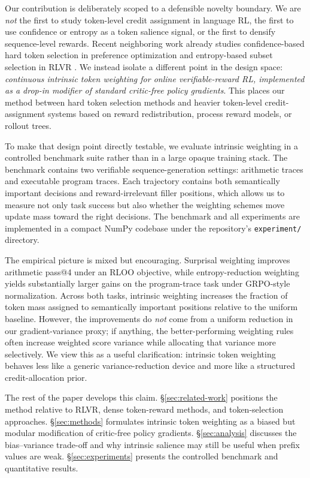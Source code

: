 Our contribution is deliberately scoped to a defensible novelty boundary. We are \emph{not} the first to study token-level credit assignment in language RL, the first to use confidence or entropy as a token salience signal, or the first to densify sequence-level rewards. Recent neighboring work already studies confidence-based hard token selection in preference optimization \citep{yoon2025confpo} and entropy-based subset selection in RLVR \citep{wang2025beyond8020}. We instead isolate a different point in the design space: \emph{continuous intrinsic token weighting for online verifiable-reward RL, implemented as a drop-in modifier of standard critic-free policy gradients}. This places our method between hard token selection methods and heavier token-level credit-assignment systems based on reward redistribution, process reward models, or rollout trees.

To make that design point directly testable, we evaluate intrinsic weighting in a controlled benchmark suite rather than in a large opaque training stack. The benchmark contains two verifiable sequence-generation settings: arithmetic traces and executable program traces. Each trajectory contains both semantically important decisions and reward-irrelevant filler positions, which allows us to measure not only task success but also whether the weighting schemes move update mass toward the right decisions. The benchmark and all experiments are implemented in a compact NumPy codebase under the repository's \texttt{experiment/} directory.

The empirical picture is mixed but encouraging. Surprisal weighting improves arithmetic pass@4 under an RLOO objective, while entropy-reduction weighting yields substantially larger gains on the program-trace task under GRPO-style normalization. Across both tasks, intrinsic weighting increases the fraction of token mass assigned to semantically important positions relative to the uniform baseline. However, the improvements do \emph{not} come from a uniform reduction in our gradient-variance proxy; if anything, the better-performing weighting rules often increase weighted score variance while allocating that variance more selectively. We view this as a useful clarification: intrinsic token weighting behaves less like a generic variance-reduction device and more like a structured credit-allocation prior.

The rest of the paper develops this claim. \S\ref{sec:related-work} positions the method relative to RLVR, dense token-reward methods, and token-selection approaches. \S\ref{sec:methods} formulates intrinsic token weighting as a biased but modular modification of critic-free policy gradients. \S\ref{sec:analysis} discusses the bias--variance trade-off and why intrinsic salience may still be useful when prefix values are weak. \S\ref{sec:experiments} presents the controlled benchmark and quantitative results.
